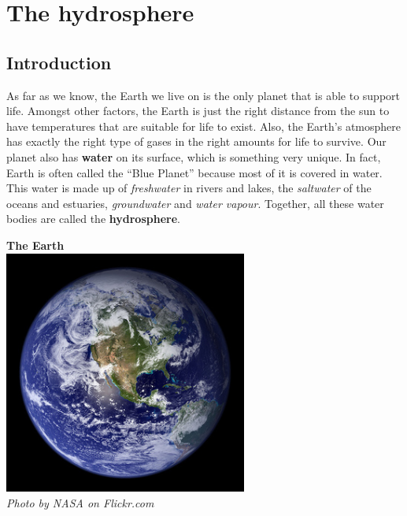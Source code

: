          \chapter{The hydrosphere}
    \setcounter{figure}{1}
    \setcounter{subfigure}{1}
    \label{m38138}
    \section{Introduction}
            \nopagebreak
\begin{minipage}{.7\textwidth}
      \label{m38138*id334056}As far as we know, the Earth we live on is the only planet that is able to support life. Amongst other factors, the Earth is just the right distance from the sun to have temperatures that are suitable for life to exist. Also, the Earth's atmosphere has exactly the right type of gases in the right amounts for life to survive. Our planet also has \textbf{water} on its surface, which is something very unique. In fact, Earth is often called the ``Blue Planet'' because most of it is covered in water. This water is made up of \textsl{freshwater} in rivers and lakes, the \textsl{saltwater} of the oceans and estuaries, \textsl{groundwater} and \textsl{water vapour}. Together, all these water bodies are called the \textbf{hydrosphere}.
\end{minipage}
\begin{minipage}{.3\textwidth}
\begin{center}
\textbf{The Earth}\\
 \includegraphics[width=0.6\textwidth]{photos/earth_space_nasa-flickr.jpg}\\
\textsl{Photo by NASA on Flickr.com}
\end{center}

\end{minipage}
